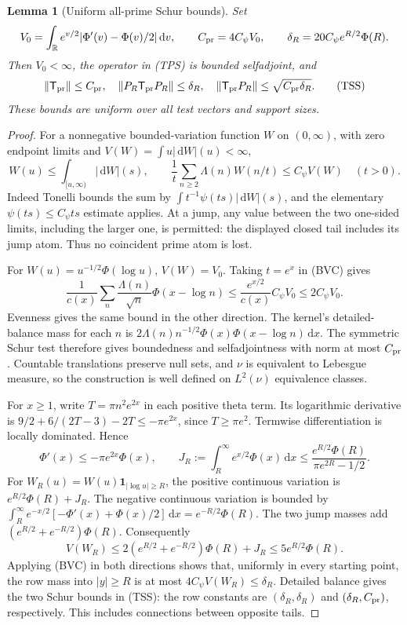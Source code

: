 \documentclass[11pt]{article}
\newtheorem{lemma}[theorem]{Lemma}
\theoremstyle{remark}\newtheorem{remark}[theorem]{Remark}
\newcommand{\R}{\mathbb R}
\newcommand{\dd}{\,\mathrm d}
\begin{document}
\begin{lemma}[Uniform all-prime Schur bounds]
\label{lem:theta-prime-schur}
Set
\[
 V_0=\int_\R e^{v/2}|\Phi'(v)-\Phi(v)/2|\dd v,\qquad
 C_{\rm pr}=4C_\psi V_0,\qquad
 \delta_R=20C_\psi e^{R/2}\Phi(R).
\]
Then $V_0<\infty$, the operator in (TPS) is bounded selfadjoint,
and
\[
 \|\mathsf T_{\rm pr}\|\le C_{\rm pr},\quad
 \|P_R\mathsf T_{\rm pr}P_R\|\le\delta_R,\quad
 \|\mathsf T_{\rm pr}P_R\|\le\sqrt{C_{\rm pr}\delta_R}.       \tag{TSS}
\]
These bounds are uniform over all test vectors and support sizes.
\end{lemma}
\begin{proof}
For a nonnegative bounded-variation function $W$ on $(0,\infty)$,
with zero endpoint limits and $V(W)=\int u|\dd W|(u)<\infty$,
\[
 W(u)\le\int_{[u,\infty)}|\dd W|(s),\qquad
 \frac1t\sum_{n\ge2}\Lambda(n)W(n/t)
       \le C_\psi V(W)\quad(t>0).                          \tag{BVC}
\]
Indeed Tonelli bounds the sum by
$\int t^{-1}\psi(ts)|\dd W|(s)$, and the elementary
$\psi(ts)\le C_\psi ts$ estimate applies. At a jump, any value
between the two one-sided limits, including the larger one,
is permitted: the displayed closed tail includes its jump atom.
Thus no coincident prime atom is lost.

For $W(u)=u^{-1/2}\Phi(\log u)$, $V(W)=V_0$.
Taking $t=e^x$ in (BVC) gives
\[
 \frac1{c(x)}\sum_n\frac{\Lambda(n)}{\sqrt n}\Phi(x-\log n)
 \le\frac{e^{x/2}}{c(x)}C_\psi V_0\le2C_\psi V_0.
\]
Evenness gives the same bound in the other direction.
The kernel's detailed-balance mass for each $n$ is
$2\Lambda(n)n^{-1/2}\Phi(x)\Phi(x-\log n)\dd x$.
The symmetric Schur test therefore gives boundedness and
selfadjointness with norm at most $C_{\rm pr}$.
Countable translations preserve null sets, and $\nu$ is equivalent
to Lebesgue measure, so the construction is well defined on
$L^2(\nu)$ equivalence classes.

For $x\ge1$, write $T=\pi n^2e^{2x}$ in each positive theta term.
Its logarithmic derivative is
$9/2+6/(2T-3)-2T\le-\pi e^{2x}$, since $T\ge\pi e^2$.
Termwise differentiation is locally dominated. Hence
\[
 \Phi'(x)\le-\pi e^{2x}\Phi(x),\qquad
 J_R:=\int_R^\infty e^{x/2}\Phi(x)\dd x
 \le\frac{e^{R/2}\Phi(R)}{\pi e^{2R}-1/2}.                 \tag{TJI}
\]
For $W_R(u)=W(u)\mathbf1_{|\log u|\ge R}$, the positive
continuous variation is $e^{R/2}\Phi(R)+J_R$.
The negative continuous variation is bounded by
$\int_R^\infty e^{-x/2}[-\Phi'(x)+\Phi(x)/2]\dd x
=e^{-R/2}\Phi(R)$. The two jump masses add
$(e^{R/2}+e^{-R/2})\Phi(R)$. Consequently
\[
 V(W_R)\le2(e^{R/2}+e^{-R/2})\Phi(R)+J_R
                                  \le5e^{R/2}\Phi(R).
\]
Applying (BVC) in both directions shows that, uniformly in every
starting point, the row mass into $|y|\ge R$ is at most
$4C_\psi V(W_R)\le\delta_R$. Detailed balance gives
the two Schur bounds in (TSS): the row constants are
$(\delta_R,\delta_R)$ and $(\delta_R,C_{\rm pr})$, respectively.
This includes connections between opposite tails.
\end{proof}
\end{document}
